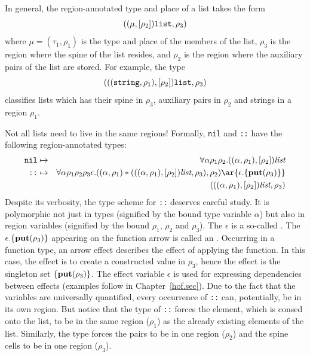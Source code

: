 \documentclass[12pt]{book}
\begin{document}
In general, 
the region-annotated type and place of a list takes the form
$$((\mu,[\rho_2])\hbox{\tt list},\rho_3)$$
where $\mu = (\tau_1,\rho_1)$ is the type and place of the members of the list, 
$\rho_3$ is the region where the spine of the list resides, 
and $\rho_2$ is the region where the auxiliary pairs of the list are stored.
For example, the type $$(((\hbox{\tt string},\rho_1),[\rho_2])\hbox{\tt list},\rho_3)$$
classifies lists which has their spine in $\rho_3$, auxiliary pairs in $\rho_2$ and
strings in a region $\rho_1$. 

Not all lists need to live in the same regions!
Formally, {\tt nil} and {\tt ::} have the following region-annotated types:
\begin{eqnarray*}
\boxml{nil} & \mapsto & \forall\alpha\rho_1\rho_2.((\alpha,\rho_1),[\rho_2])\LIST\\
\boxml{::}  & \mapsto & \forall\alpha\rho_1\rho_2\rho_3\epsilon.((\alpha,\rho_1)\ast(((\alpha,\rho_1),[\rho_2])\LIST,\rho_3),\rho_2)
\ar{\epsilon.\{\Put(\rho_3)\}}\\
&&\qquad\qquad\qquad(((\alpha,\rho_1),[\rho_2])\LIST,\rho_3)
\end{eqnarray*}
Despite its verbosity, 
the type scheme for {\tt ::} deserves careful study. It is polymorphic not just in types
(signified by the bound type variable $\alpha$) but also in region variables (signified by the 
bound $\rho_1$, $\rho_2$ and $\rho_3$). The $\epsilon$ is a so-called . 
The 
$\epsilon.\{\mathop{\bf put}\nolimits(\rho_3)\}$ appearing on the function arrow is called an .
Occurring in a function type, an arrow effect describes the effect of applying the function.
In this case, the effect is to create a constructed value in $\rho_3$, hence the effect is
the singleton set $\{\mathop{\bf put}\nolimits(\rho_3)\}$. The effect variable $\epsilon$ is used for expressing dependencies between
effects (examples follow in Chapter~\ref{hof.sec}). Due to the fact that the variables are universally quantified, every
occurrence of {\tt ::} can, potentially, be in its own region. But notice that the type
of {\tt ::} forces the element, which is consed onto the list, to be in the same region ($\rho_1$)
as the already existing elements of the list. Similarly, the type forces the pairs to be in
one region ($\rho_2$) and the spine cells to be in one region ($\rho_3$).
\end{document}
